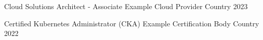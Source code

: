 

\begin{cvhonors}

  \cvhonor
    {Cloud Solutions Architect - Associate} %
    {Example Cloud Provider} %
    {Country} %
    {2023} %

  \cvhonor
    {Certified Kubernetes Administrator (CKA)} %
    {Example Certification Body} %
    {Country} %
    {2022} %

\end{cvhonors}

